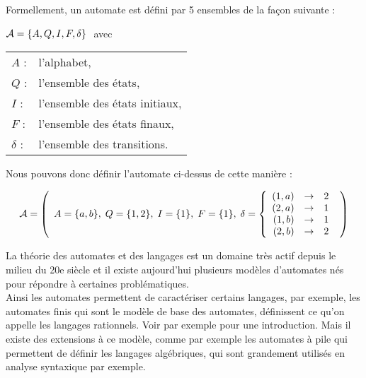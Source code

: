 \documentclass[12pt]{memoir}
\begin{document}
\bigskip
Formellement, un automate est défini par 5 ensembles de la façon suivante :
\begin{center}
 $ \mathcal{A} = \{ A, Q, I, F, \delta \}\ $     avec
 \end{center}
 \begin{tabular}[h]{ll}
$A$ :& l’alphabet,\\
$Q$ :& l'ensemble des états,\\
$I$ :& l'ensemble des états initiaux,\\
$F$ :& l'ensemble des états finaux,\\
$\delta$ :& l'ensemble des transitions.\\
\end{tabular}

\medskip\noindent
Nous pouvons donc définir l'automate ci-dessus de cette manière :

\[\mathcal{A} = \left(
\begin{array}{rcr}
			A= \{a, b\},\;
			Q=\{1, 2\},\; 
			I=\{1\},\; 
			F=\{1\},\; 
			\delta=
				\left\{
					\begin{array}{rcr}
						(1,a) & \rightarrow & 2 \\
						(2,a) & \rightarrow & 1 \\
						(1,b) & \rightarrow & 1 \\
						(2,b) & \rightarrow & 2 \\
					\end{array}
				\right.
\end{array}
\right)\]

La théorie des automates et des langages est un domaine très actif depuis le milieu du 20e siècle et il existe aujourd'hui plusieurs modèles d'automates nés pour répondre à certaines problématiques. 
\\

Ainsi les automates permettent de caractériser certains langages, par exemple,
les automates finis qui sont le modèle de base des automates, définissent ce
qu'on appelle les langages rationnels. Voir par exemple
\cite{Elements-d-algorithmique} pour une introduction. Mais il existe des
extensions à ce modèle, comme par exemple les automates à pile qui permettent
de définir les langages algébriques, qui sont grandement utilisés en analyse
syntaxique par exemple.
\end{document}
